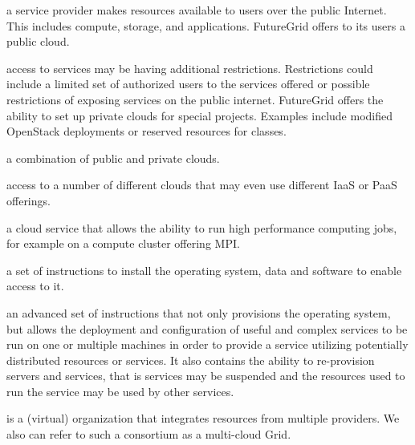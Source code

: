 \documentclass{tex/sig-alternate-2013}
\begin{document}
\begin{description}[leftmargin=*,itemsep=0pt,topsep=0pt]

\item[Public cloud:]  a service provider makes resources available to users over the public Internet. This includes compute, storage, and applications. FutureGrid offers to its users a public cloud. 

\item[Private cloud:] access to services may be having additional restrictions. Restrictions could include a limited set of authorized users to the services offered or  possible restrictions of exposing services on the public internet. FutureGrid offers the ability to set up private clouds for special projects. Examples include modified OpenStack deployments or reserved resources for classes.

\item[Hybrid cloud:] a combination of public and private clouds. 

\item[Multi-cloud:] access to a number of different clouds that may even use different IaaS or PaaS offerings. 

\item[HPC service:] a cloud service that allows the ability to run high performance computing jobs, for example on a compute cluster offering MPI. 

\item[Provisioning:] a set of instructions to install the operating system, data and software to enable access to it. 

\item[Rain:] an advanced set of instructions that not only provisions the operating system, but allows the deployment and configuration of useful and complex services to be run on one or multiple machines in order to provide a service utilizing potentially distributed resources or services.  It also contains the ability to re-provision servers and services, that is services may be suspended and the resources used to run the service may be used by other services.

\item[Provider consortium:] is a (virtual) organization that integrates resources from multiple providers. We also can refer to such a consortium as a multi-cloud Grid.

\end{description}
\end{document}
